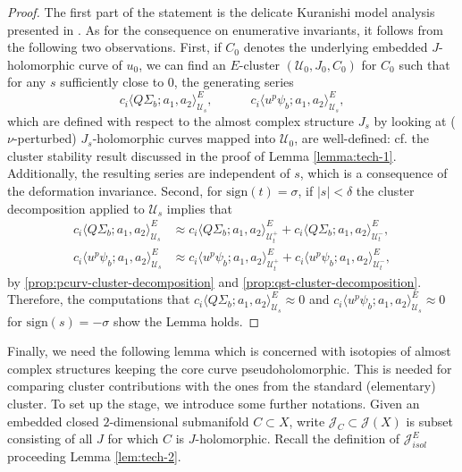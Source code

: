 \documentclass[reqno]{amsart}
\numberwithin{equation}{section}
\numberwithin{equation}{section}
\numberwithin{equation}{section}
\theoremstyle{definition}
\theoremstyle{remark}
\theoremstyle{remark}
\begin{document}
\begin{proof}
    The first part of the statement is the delicate Kuranishi model analysis presented in \cite[Corollary 6.3]{IP-GV}. As for the consequence on enumerative invariants, it follows from the following two observations. First, if $C_0$ denotes the underlying embedded $J$-holomorphic curve of $u_0$, we can find an $E$-cluster $(\mathcal{U}_0, J_0, C_0)$ for $C_0$ such that for any $s$ sufficiently close to $0$, the generating series
    \begin{equation}
        c_i \langle Q\Sigma_b ; a_1, a_2 \rangle^E_{\mathcal{U}_s}, \quad \quad \quad c_i \langle u^p \psi_b; a_1, a_2 \rangle^E_{\mathcal{U}_s},
    \end{equation}
    which are defined with respect to the almost complex structure $J_s$ by looking at ($\nu$-perturbed) $J_s$-holomorphic curves mapped into $\mathcal{U}_0$, are well-defined: cf. the cluster stability result discussed in the proof of Lemma \ref{lemma:tech-1}. Additionally, the resulting series are independent of $s$, which is a consequence of the deformation invariance. Second, for $\mathrm{sign}(t) = \sigma$, if $|s| < \delta$ the cluster decomposition applied to $\mathcal{U}_s$ implies that
    \begin{equation}
    \begin{aligned}
        c_i \langle Q\Sigma_b ; a_1, a_2 \rangle^E_{\mathcal{U}_s} &\approx c_i \langle Q\Sigma_b ; a_1, a_2 \rangle^E_{\mathcal{U}_t^+} + c_i \langle Q\Sigma_b ; a_1, a_2 \rangle^E_{\mathcal{U}_t^-}, \\ 
        c_i \langle u^p \psi_b; a_1, a_2 \rangle^E_{\mathcal{U}_s} &\approx c_i \langle u^p \psi_b; a_1, a_2 \rangle^E_{\mathcal{U}_t^+}  +c_i  \langle u^p \psi_b; a_1, a_2 \rangle^E_{\mathcal{U}_t^-},
    \end{aligned}
    \end{equation}
    by \cref{prop:pcurv-cluster-decomposition} and \cref{prop:qst-cluster-decomposition}. Therefore, the computations that $c_i \langle Q\Sigma_b ; a_1, a_2 \rangle^E_{\mathcal{U}_s} \approx 0$ and $c_i \langle u^p \psi_b; a_1, a_2 \rangle^E_{\mathcal{U}_s} \approx 0$ for $\mathrm{sign}(s) = - \sigma$ show the Lemma holds.
\end{proof}

Finally, we need the following lemma which is concerned with isotopies of almost complex structures keeping the core curve pseudoholomorphic. This is needed for comparing cluster contributions with the ones from the standard (elementary) cluster. To set up the stage, we introduce some further notations. Given an embedded closed $2$-dimensional submanifold $C \subset X$, write $\mathcal{J}_C \subset \mathcal{J}(X)$ is subset consisting of all $J$ for which $C$ is $J$-holomorphic. Recall the definition of $\mathcal{J}^E_{isol}$ proceeding Lemma \ref{lem:tech-2}.
\end{document}

